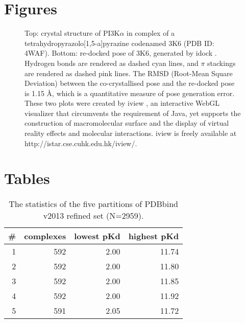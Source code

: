 \documentclass[twocolumn]{bmcart}
\begin{document}
\begin{backmatter}

\section*{Figures}

\begin{figure}[h]
\caption{ Top: crystal structure of PI3K$\alpha$ in complex of a tetrahydropyrazolo[1,5-a]pyrazine codenamed 3K6 (PDB ID: 4WAF). Bottom: re-docked pose of 3K6, generated by idock \cite{1362}. Hydrogen bonds are rendered as dashed cyan lines, and $\pi$ stackings are rendered as dashed pink lines. The RMSD (Root-Mean Square Deviation) between the co-crystallised pose and the re-docked pose is 1.15 \AA, which is a quantitative measure of pose generation error. These two plots were created by iview \cite{1366}, an interactive WebGL visualizer that circumvents the requirement of Java, yet supports the construction of macromolecular surface and the display of virtual reality effects and molecular interactions. iview is freely available at http://istar.cse.cuhk.edu.hk/iview/.
}
\label{fig:stat}
\end{figure}


\section*{Tables}

\begin{table}[ht]
\caption{The statistics of the five partitions of PDBbind v2013 refined set (N=2959).}
\label{tbl:partitions}
\begin{tabular}{rrrr}
\hline
\# & complexes & lowest pKd & highest pKd\\
\hline
1 & 592 & 2.00 & 11.74\\
2 & 592 & 2.00 & 11.80\\
3 & 592 & 2.00 & 11.85\\
4 & 592 & 2.00 & 11.92\\
5 & 591 & 2.05 & 11.72\\
\hline
\end{tabular}
\end{table}


\end{backmatter}
\end{document}
